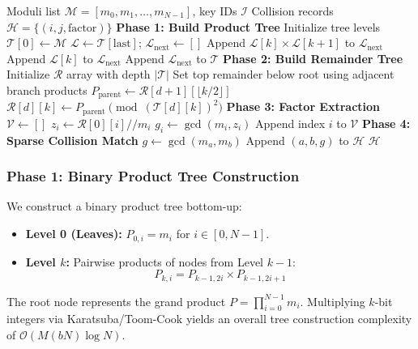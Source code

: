 \documentclass[sigconf,nonacm]{acmart}
\begin{document}
\begin{algorithm}[htbp]
\caption{Subquadratic Batch-GCD Algorithm}
\label{alg:batch_gcd}
\begin{algorithmic}[1]
\REQUIRE Moduli list $\mathcal{M} = [m_0, m_1, \dots, m_{N-1}]$, key IDs $\mathcal{I}$
\ENSURE Collision records $\mathcal{H} = \{(i, j, \text{factor})\}$
\STATE \textbf{Phase 1: Build Product Tree}
\STATE Initialize tree levels $\mathcal{T}[0] \leftarrow \mathcal{M}$
    \STATE $\mathcal{L} \leftarrow \mathcal{T}[\text{last}]$; $\mathcal{L}_{\text{next}} \leftarrow []$
            \STATE Append $\mathcal{L}[k] \times \mathcal{L}[k+1]$ to $\mathcal{L}_{\text{next}}$
        \ELSE
            \STATE Append $\mathcal{L}[k]$ to $\mathcal{L}_{\text{next}}$
        \ENDIF
    \ENDFOR
    \STATE Append $\mathcal{L}_{\text{next}}$ to $\mathcal{T}$
\ENDWHILE
\STATE \textbf{Phase 2: Build Remainder Tree}
\STATE Initialize $\mathcal{R}$ array with depth $|\mathcal{T}|$
\STATE Set top remainder below root using adjacent branch products
        \STATE $P_{\text{parent}} \leftarrow \mathcal{R}[d+1][\lfloor k/2 \rfloor]$
        \STATE $\mathcal{R}[d][k] \leftarrow P_{\text{parent}} \pmod{(\mathcal{T}[d][k])^2}$
    \ENDFOR
\ENDFOR
\STATE \textbf{Phase 3: Factor Extraction}
\STATE $\mathcal{V} \leftarrow []$
    \STATE $z_i \leftarrow \mathcal{R}[0][i] // m_i$
    \STATE $g_i \leftarrow \gcd(m_i, z_i)$
        \STATE Append index $i$ to $\mathcal{V}$
    \ENDIF
\ENDFOR
\STATE \textbf{Phase 4: Sparse Collision Match}
    \STATE $g \leftarrow \gcd(m_a, m_b)$
        \STATE Append $(a, b, g)$ to $\mathcal{H}$
    \ENDIF
\ENDFOR
\RETURN $\mathcal{H}$
\end{algorithmic}
\end{algorithm}

\subsubsection{Phase 1: Binary Product Tree Construction}
We construct a binary product tree bottom-up:
\begin{itemize}
    \item \textbf{Level 0 (Leaves):} $P_{0, i} = m_i$ for $i \in [0, N-1]$.
    \item \textbf{Level $k$:} Pairwise products of nodes from Level $k-1$:
    \begin{equation}
    P_{k, i} = P_{k-1, 2i} \times P_{k-1, 2i+1}
    \end{equation}
\end{itemize}
The root node represents the grand product $P = \prod_{i=0}^{N-1} m_i$. Multiplying $k$-bit integers via Karatsuba/Toom-Cook yields an overall tree construction complexity of $\mathcal{O}(M(b N) \log N)$.
\end{document}
